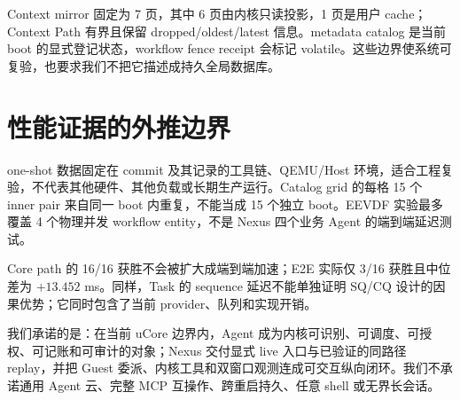 Context mirror 固定为 7 页，其中 6 页由内核只读投影，1 页是用户 cache；Context Path 有界且保留 dropped/oldest/latest 信息。metadata catalog 是当前 boot 的显式登记状态，workflow fence receipt 会标记 volatile。这些边界使系统可复验，也要求我们不把它描述成持久全局数据库。

\section{性能证据的外推边界}

one-shot 数据固定在 commit  及其记录的工具链、QEMU/Host 环境，适合工程复验，不代表其他硬件、其他负载或长期生产运行。Catalog grid 的每格 15 个 inner pair 来自同一 boot 内重复，不能当成 15 个独立 boot。EEVDF 实验最多覆盖 4 个物理并发 workflow entity，不是 Nexus 四个业务 Agent 的端到端延迟测试。

Core path 的 16/16 获胜不会被扩大成端到端加速；E2E 实际仅 3/16 获胜且中位差为 $+13.452$ ms。同样，Task 的 sequence 延迟不能单独证明 SQ/CQ 设计的因果优势；它同时包含了当前 provider、队列和实现开销。

\begin{boundarybox}[本项目的当前承诺]
我们承诺的是：在当前 uCore 边界内，Agent 成为内核可识别、可调度、可授权、可记账和可审计的对象；Nexus 交付显式 live 入口与已验证的同路径 replay，并把 Guest 委派、内核工具和双窗口观测连成可交互纵向闭环。我们不承诺通用 Agent 云、完整 MCP 互操作、跨重启持久、任意 shell 或无界长会话。
\end{boundarybox}
